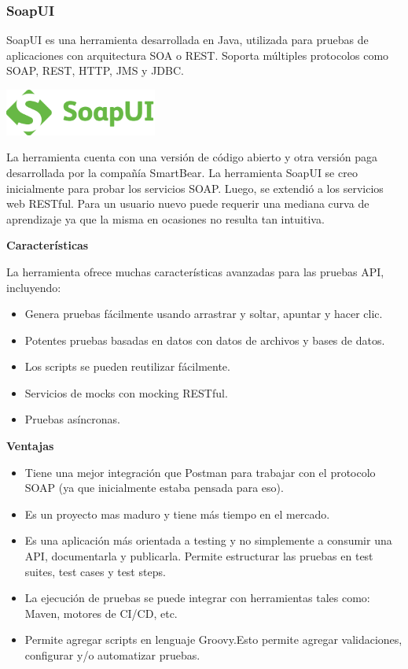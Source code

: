 \documentclass{article}
\begin{document}
\begin{multicols}{2}
\subsubsection{SoapUI}
SoapUI es una herramienta desarrollada en Java, utilizada para pruebas de aplicaciones con arquitectura SOA o REST. Soporta múltiples protocolos como SOAP, REST, HTTP, JMS y JDBC.
\begin{center}
    \includegraphics[width=5cm]{Imagenes/soapui.png}
\end{center}

La herramienta cuenta con una versión de código abierto y otra versión paga desarrollada por la compañía SmartBear. La herramienta SoapUI se creo inicialmente para probar los servicios SOAP. Luego, se extendió a los servicios web RESTful.
Para un usuario nuevo puede requerir una mediana curva de aprendizaje ya que la misma en ocasiones no resulta tan intuitiva.

\textbf{Características}

La herramienta ofrece muchas características avanzadas para las pruebas API, incluyendo:
\begin{itemize}
    \item Genera pruebas fácilmente usando arrastrar y soltar, apuntar y hacer clic.
    \item Potentes pruebas basadas en datos con datos de archivos y bases de datos.
    \item Los scripts se pueden reutilizar fácilmente.
    \item Servicios de mocks con mocking RESTful.
    \item Pruebas asíncronas.
\end{itemize}

\textbf{Ventajas}

\begin{itemize}
    \item Tiene una mejor integración que Postman para trabajar con el protocolo SOAP (ya que inicialmente estaba pensada para eso).
    \item Es un proyecto mas maduro y tiene más tiempo en el mercado.
    \item Es una aplicación más orientada a testing y no simplemente a consumir una API, documentarla y publicarla. Permite estructurar las pruebas en test suites, test cases y test steps.
    \item La ejecución de pruebas se puede integrar con herramientas tales como: Maven, motores de CI/CD, etc.
    \item Permite agregar scripts en lenguaje Groovy.Esto permite agregar validaciones, configurar y/o automatizar pruebas.
\end{itemize}


\end{multicols}
\end{document}
